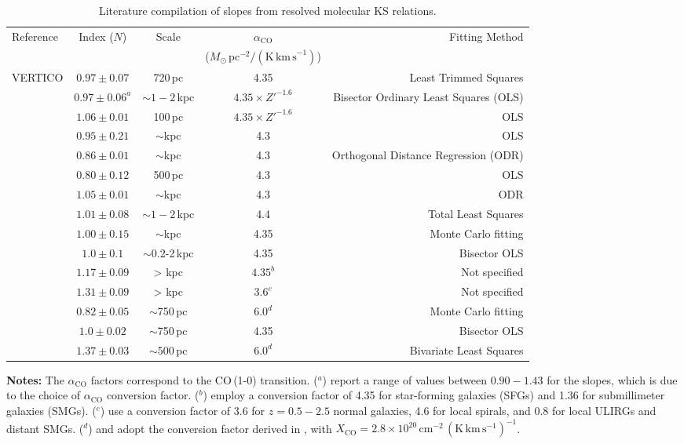 \documentclass[longauth]{aa}
\begin{document}
\begin{table*}
\centering
\caption{{Literature compilation of slopes from resolved molecular KS relations.}}
\begin{tabular}{lcccr}
\hline
\hline
Reference & Index ($N$) & Scale & $\alpha_\mathrm{CO}$ & Fitting Method \\
&  &  & ($M_\odot\,\mathrm{pc}^{-2}/(\mathrm{K\,km\,s}^{-1})$) & \\
\hline
VERTICO & $0.97\pm0.07$ & 720\,pc & 4.35 & Least Trimmed Squares\\
\citet{Querejeta2021} & $0.97\pm0.06^a$ & $\sim 1-2$\,kpc & $4.35 \times Z'^{-1.6}$ & Bisector Ordinary Least Squares (OLS)\\
\citet{Pessa2021} & $1.06\pm0.01$ & 100\,pc & $4.35 \times Z'^{-1.6}$ & OLS\\
\citet{Sanchez2021} &  $0.95\pm0.21$ & $\sim$kpc & 4.3 & OLS\\
\citet{Ellison2021} &  $0.86\pm0.01$ & $\sim$kpc & 4.3 & Orthogonal Distance Regression (ODR)\\
\citet{Morselli2020} & $0.80\pm0.12$ & 500\,pc & 4.3 & OLS\\
\citet{Lin2019} & $1.05\pm0.01$ & $\sim$kpc & 4.3 & ODR\\
\cite{Usero2015}  & $1.01\pm0.08$ & $\sim 1-2$\,kpc & 4.4 &Total Least Squares\\
\citet{Leroy2013}  & $1.00\pm0.15$ & $\sim$kpc & 4.35 & Monte Carlo fitting\\
\citet{Schruba2011} & $1.0\pm0.1$ & $\sim$0.2-2\,kpc & 4.35 & Bisector OLS\\
\cite{Genzel2010} & $1.17\pm0.09$ & > kpc & $4.35^b$ & Not specified\\
\cite{Daddi2010} & $1.31\pm0.09$ & > kpc & $3.6^c$ & Not specified\\
\citet{Blanc2009}  & $0.82\pm0.05$ & $\sim$750\,pc & $6.0^d$ & Monte Carlo fitting\\
\citet{Bigiel2008} & $1.0\pm0.02$ & $\sim$750\,pc & 4.35 & Bisector OLS\\
\cite{Kennicutt2007} & $1.37\pm0.03$ & $\sim$500\,pc & $6.0^d$ & Bivariate Least Squares\\

\hline
\end{tabular}

    \begin{minipage}{2.0\columnwidth}
        \vspace{1mm}
        {\bf Notes:} The $\alpha_\mathrm{CO}$ factors correspond to the CO\,(1-0) transition. ($^a$) \citet{Querejeta2021} report a range of values between $0.90-1.43$ for the slopes, which is due to the choice of $\alpha_\textrm{CO}$ conversion factor. ($^b$) \citet{Genzel2010} employ a conversion factor of 4.35 for star-forming galaxies (SFGs) and 1.36 for submillimeter galaxies (SMGs). ($^c$) \citet{Daddi2010} use a conversion factor of 3.6 for $z=0.5-2.5$ normal galaxies, 4.6 for local spirals, and 0.8 for local ULIRGs and distant SMGs. ($^d$) \citet{Blanc2009} and \citet{Kennicutt2007} adopt the conversion factor derived in \citet{Bloemen1986}, with $X_{\mathrm{CO}}=2.8\times10^{20}\,\mathrm{cm}^{-2}\,\mathrm{(K\,km\,s^{-1})}^{-1}$.


\end{minipage}
\end{table*}
\end{document}
